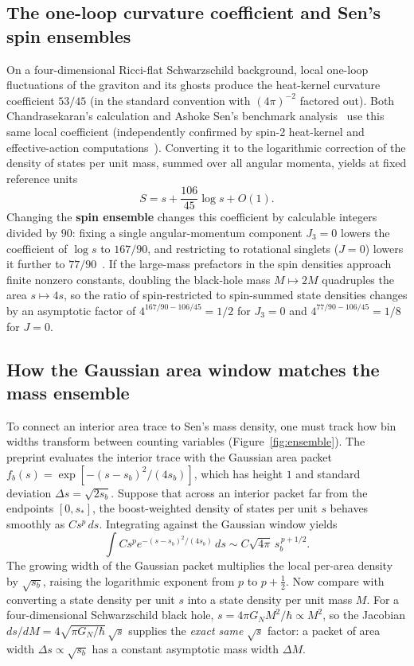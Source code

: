 \documentclass[10pt,a4paper]{article}
\begin{document}
\subsection{The one-loop curvature coefficient and Sen's spin ensembles}
On a four-dimensional Ricci-flat Schwarzschild background, local one-loop fluctuations of the graviton and its ghosts produce the heat-kernel curvature coefficient $53/45$ (in the standard convention with $(4\pi)^{-2}$ factored out). Both Chandrasekaran's calculation and Ashoke Sen's benchmark analysis~\cite{sen2012} use this same local coefficient (independently confirmed by spin-2 heat-kernel and effective-action computations~\cite{bastianelli2022,elmenoufi2015}). Converting it to the logarithmic correction of the density of states per unit mass, summed over all angular momenta, yields at fixed reference units
\begin{equation}
  S = s + \frac{106}{45}\log s + O(1).
  \label{eq:sen-log}
\end{equation}
Changing the \textbf{spin ensemble} changes this coefficient by calculable integers divided by $90$: fixing a single angular-momentum component $J_3 = 0$ lowers the coefficient of $\log s$ to $167/90$, and restricting to rotational singlets ($J = 0$) lowers it further to $77/90$~\cite{sen2012}. If the large-mass prefactors in the spin densities approach finite nonzero constants, doubling the black-hole mass $M \mapsto 2M$ quadruples the area $s \mapsto 4s$, so the ratio of spin-restricted to spin-summed state densities changes by an asymptotic factor of $4^{167/90 - 106/45} = 1/2$ for $J_3 = 0$ and $4^{77/90 - 106/45} = 1/8$ for $J = 0$.

\subsection{How the Gaussian area window matches the mass ensemble}
To connect an interior area trace to Sen's mass density, one must track how bin widths transform between counting variables (Figure~\ref{fig:ensemble}). The preprint evaluates the interior trace with the Gaussian area packet $f_b(s) = \exp[-(s - s_b)^2/(4s_b)]$, which has height $1$ and standard deviation $\Delta s = \sqrt{2s_b}$. Suppose that across an interior packet far from the endpoints $[0, s_*]$, the boost-weighted density of states per unit $s$ behaves smoothly as $C s^p\,ds$. Integrating against the Gaussian window yields
\begin{equation}
  \int C s^p e^{-(s - s_b)^2/(4s_b)}\,ds
  \sim C\sqrt{4\pi}\,s_b^{\,p + 1/2}.
  \label{eq:packet}
\end{equation}
The growing width of the Gaussian packet multiplies the local per-area density by $\sqrt{s_b}$, raising the logarithmic exponent from $p$ to $p + \tfrac{1}{2}$. Now compare with converting a state density per unit $s$ into a state density per unit mass $M$. For a four-dimensional Schwarzschild black hole, $s = 4\pi G_N M^2/\hbar \propto M^2$, so the Jacobian $ds/dM = 4\sqrt{\pi G_N/\hbar}\,\sqrt{s}$ supplies the \emph{exact same} $\sqrt{s}$ factor: a packet of area width $\Delta s \propto \sqrt{s_b}$ has a constant asymptotic mass width $\Delta M$.
\end{document}
